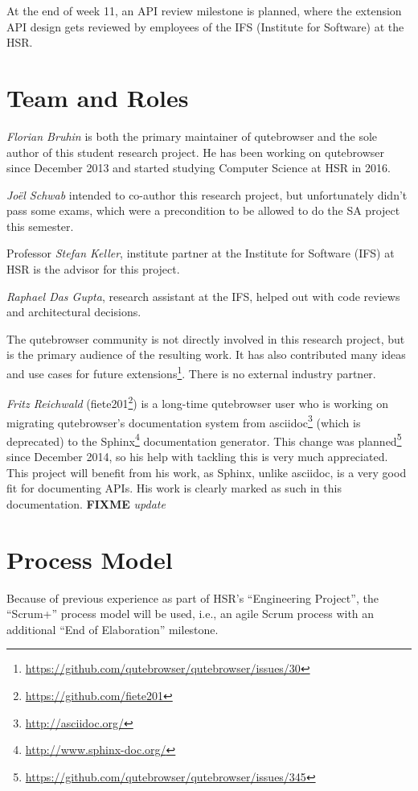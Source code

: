 \documentclass[a4paper,parskip=full]{scrreprt}
\newcommand{\fixme}[1]{\textbf{FIXME} \emph{#1}}
\begin{document}
At the end of week 11, an API review milestone is planned, where the extension
API design gets reviewed by employees of the IFS (Institute for Software) at the
HSR.

\section{Team and Roles}
\emph{Florian Bruhin} is both the primary maintainer of qutebrowser and the
sole author of this student research project. He has been working on qutebrowser since
December 2013 and started studying Computer Science at HSR in 2016.

\emph{Joël Schwab} intended to co-author this research project, but
unfortunately didn't pass some exams, which were a precondition to be allowed to
do the SA project this semester.

Professor \emph{Stefan Keller}, institute partner at the Institute for Software
(IFS) at HSR is the advisor for this project.

\emph{Raphael Das Gupta}, research assistant at the IFS, helped out with code
reviews and architectural decisions.

The qutebrowser community is not directly involved in this research project, but
is the primary audience of the resulting work. It has also contributed many
ideas and use cases for future
extensions\footnote{\url{https://github.com/qutebrowser/qutebrowser/issues/30}}.
There is no external industry partner.

\label{fiete}
\emph{Fritz Reichwald} (fiete201\footnote{\url{https://github.com/fiete201}})
is a long-time qutebrowser user who is working on migrating qutebrowser's
documentation system from asciidoc\footnote{\url{http://asciidoc.org/}} (which
is deprecated) to the Sphinx\footnote{\url{http://www.sphinx-doc.org/}}
documentation generator. This change was
planned\footnote{\url{https://github.com/qutebrowser/qutebrowser/issues/345}}
since December 2014, so his help with tackling this is very much appreciated.
This project will benefit from his work, as Sphinx, unlike asciidoc, is a
very good fit for documenting APIs. His work is clearly marked as such in this
documentation. \fixme{update}

\section{Process Model}
Because of previous experience as part of HSR's ``Engineering Project'', the
``Scrum+'' process model will be used, i.e., an agile Scrum process with an
additional ``End of Elaboration'' milestone.
\end{document}
